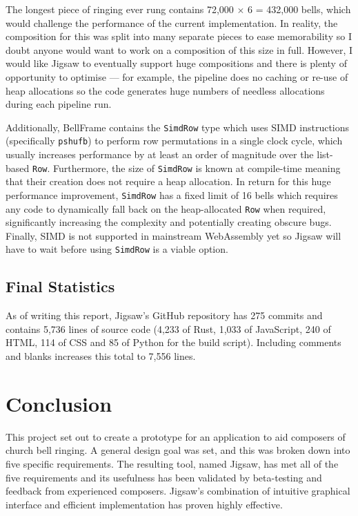 \documentclass[12pt]{article}
\begin{document}
The longest piece of ringing ever rung contains 72,000 $\times$ 6 = 432,000 bells, which would
challenge the performance of the current implementation.  In reality, the composition for this was
split into many separate pieces to ease memorability so I doubt anyone would want to work on a
composition of this size in full.  However, I would like Jigsaw to eventually support huge
compositions and there is plenty of opportunity to optimise --- for example, the pipeline does no
caching or re-use of heap allocations so the code generates huge numbers of needless allocations
during each pipeline run.

Additionally, BellFrame contains the \verb|SimdRow| type which uses SIMD instructions
(specifically \verb|pshufb|) to perform row permutations in a single clock cycle, which usually
increases performance by at least an order of magnitude over the list-based \verb|Row|.
Furthermore, the size of \verb|SimdRow| is known at compile-time meaning that their creation does
not require a heap allocation.  In return for this huge performance improvement,
\verb|SimdRow| has a fixed limit of 16 bells which requires any code to dynamically fall back on the
heap-allocated \verb|Row| when required, significantly increasing the complexity and potentially
creating obscure bugs.  Finally, SIMD is not supported in mainstream WebAssembly yet so Jigsaw will
have to wait before using \verb|SimdRow| is a viable option.

\subsection{Final Statistics}

As of writing this report, Jigsaw's GitHub repository has 275 commits and contains 5,736
lines of source code (4,233 of Rust, 1,033 of JavaScript, 240 of HTML, 114 of CSS and 85 of
Python for the build script).  Including comments and blanks increases this total to 7,556 lines.



\pagebreak

\section{Conclusion}

This project set out to create a prototype for an application to aid composers of church bell
ringing.  A general design goal was set, and this was broken down into five specific requirements.
The resulting tool, named Jigsaw, has met all of the five requirements and its usefulness has been
validated by beta-testing and feedback from experienced composers. Jigsaw's combination of intuitive
graphical interface and efficient implementation has proven highly effective.
\end{document}

